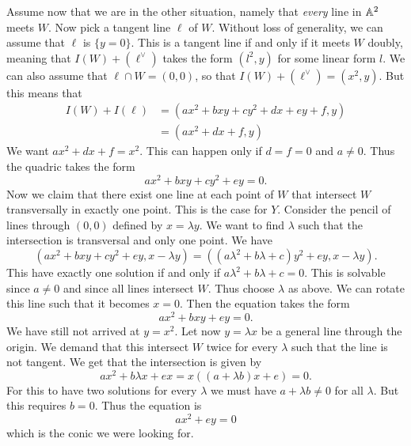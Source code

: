 \documentclass[11pt, english]{article}
\begin{document}
\begin{sol}
\begin{enumerate}[a)]
Assume now that we are in the other situation, namely that \emph{every} line in $\mathbb{A}^2$ meets $W$. Now pick a tangent line $\ell$ of $W$. Without loss of generality, we can assume that $\ell$ is $\{ y=0 \}$. This is a tangent line if and only if it meets $W$ doubly, meaning that $I(W) + (\ell^\vee)$ takes the form $(l^2,y)$ for some linear form $l$. We can also assume that $\ell \cap W = (0,0)$, so that $I(W) + (\ell^\vee) =(x^2,y)$. But this means that
\begin{align*}
  I(W) + I(\ell) &= (ax^2+bxy+cy^2+dx+ey+f,y) \\
&= (ax^2+dx+f,y)
\end{align*}
We want $ax^2+dx+f=x^2$. This can happen only if $d=f=0$ and $a \neq 0$. Thus the quadric takes the form
\[
ax^2+bxy+cy^2+ey=0.
\]
Now we claim that there exist one line at each point of $W$ that intersect $W$ transversally in exactly one point. This is the case for $Y$. Consider the pencil of lines through $(0,0)$ defined by $x=\lambda y$. We want to find $\lambda$ such that the intersection is transversal and only one point. We have
\[
( ax^2+bxy+cy^2+ey, x-\lambda y) = \left( (a\lambda ^2+b\lambda+c)y^2+ey,x-\lambda y \right).
\]
This have exactly one solution if and only if $a\lambda^2+b\lambda+c=0$. This is solvable since $a \neq 0$ and since all lines intersect $W$. Thus choose $\lambda$ as above. We can rotate this line such that it becomes $x=0$. Then the equation takes the form
\[
ax^2+bxy+ey=0.
\]
We have still not arrived at $y=x^2$. Let now $y=\lambda x$ be a general line through the origin. We demand that this intersect $W$ twice for every $\lambda$ such that the line is not tangent. We get that the intersection is given by
\[
ax^2+b\lambda x+ex = x((a+\lambda b)x+e) = 0.
\]
For this to have two solutions for every $\lambda$ we must have $a+\lambda b \neq 0$ for all $\lambda$. But this requires $b =0$.  Thus the equation is
\[
ax^2+ey = 0
\]
which is the conic we were looking for.
  \end{enumerate}
\end{sol}
\end{document}
